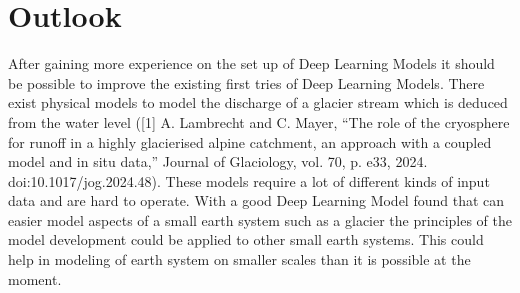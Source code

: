 \documentclass[a4paper,12pt]{article}
\begin{document}
\section{Outlook}

After gaining more experience on the set up of Deep Learning Models it should be possible to improve the existing first tries of Deep Learning Models. There exist physical models to model the discharge of a glacier stream which is deduced from the water level ([1] A. Lambrecht and C. Mayer, “The role of the cryosphere for runoff in a highly glacierised alpine catchment, an approach with a coupled model and in situ data,” Journal of Glaciology, vol. 70, p. e33, 2024. doi:10.1017/jog.2024.48). These models require a lot of different kinds of input data and are hard to operate. With a good Deep Learning Model found that can easier model aspects of a small earth system such as a glacier the principles of the model development could be applied to other small earth systems. This could help in modeling of earth system on smaller scales than it is possible at the moment.
\end{document}
